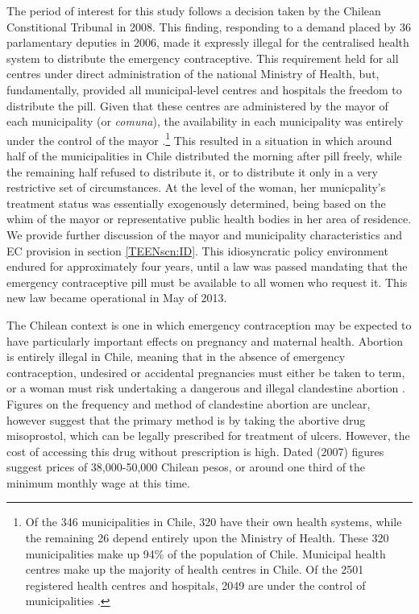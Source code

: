 The period of interest for this study follows a decision taken by the Chilean
Constitional Tribunal in 2008.  This finding, responding to a demand placed by
36 parlamentary deputies in 2006, made it expressly illegal for the centralised
health system to distribute the emergency contraceptive.  This requirement held
for all centres under direct administration of the national Ministry of Health,
but, fundamentally, provided all municipal-level centres and hospitals the 
freedom to distribute the pill.  Given that these centres are administered by 
the mayor of each municipality (or \emph{comuna}), the availability in each 
municipality was entirely under the control of the mayor \citep{Didesetal2011,
Didesetal2010,Didesetal2009}.\footnote{Of the 346 municipalities in Chile, 320
have their own health systems, while the remaining 26 depend entirely upon the
Ministry of Health.  These 320 municipalities make up 94\% of the population 
of Chile.  Municipal health centres make up the majority of health centres in 
Chile.  Of the 2501 registered health centres and hospitals, 2049 are under the
control of municipalities \citep{DEIS2013}.}  This resulted in a situation in
which around half of the municipalities in Chile distributed the morning after
pill freely, while the remaining half refused to distribute it, or to 
distribute it only in a very restrictive set of circumstances.  At the level
of the woman, her municpality's treatment status was essentially exogenously
determined, being based on the whim of the mayor or representative public 
health bodies in her area of residence.  We provide further discussion of the
mayor and municipality characteristics and EC provision in section 
\ref{TEENscn:ID}.  This idiosyncratic policy environment endured for 
approximately four years, until a law was passed mandating that the emergency 
contraceptive pill must be available to all women who request it.  This new 
law became operational in May of 2013.

The Chilean context is one in which emergency contraception may be expected to
have particularly important effects on pregnancy and maternal health.  Abortion
is entirely illegal in Chile, meaning that in the absence of emergency 
contraception, undesired or accidental pregnancies must either be taken to 
term, or a woman must risk undertaking a dangerous and illegal clandestine
abortion \citep{ShepardCasas2007}.  Figures on the frequency and method of 
clandestine abortion are unclear, however \citet{ShepardCasas2007} suggest that
the primary method is by taking the abortive drug misoprostol, which can be
legally prescribed for treatment of ulcers.  However, the cost of accessing 
this drug without prescription is high.  Dated (2007) figures suggest prices
of 38,000-50,000 Chilean pesos, or around one third of the minimum monthly wage
at this time.

